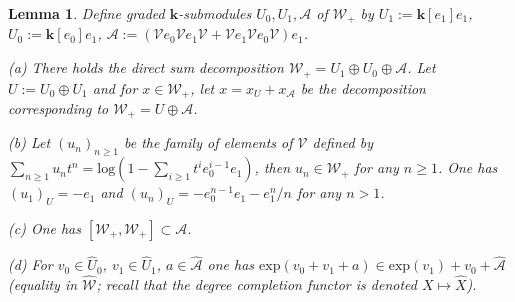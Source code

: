 \documentclass[10pt]{amsart}
\newtheorem{lem}[thm]{Lemma}
\numberwithin{equation}{subsection}
\begin{document}
\begin{lem}\label{lemma:basics:BIS}
Define graded $\mathbf k$-submodules  $U_0,U_1,\mathcal A$ of $\mathcal W_+$ by 
$U_1:=\mathbf k[e_1]e_1$, $U_0:=\mathbf k[e_0]e_1$, 
$\mathcal A:=(\mathcal Ve_0\mathcal Ve_1\mathcal V+\mathcal Ve_1\mathcal Ve_0\mathcal V)e_1$.

(a) There holds the direct sum decomposition $\mathcal W_+=U_1\oplus U_0\oplus\mathcal A$. Let $U:=U_0\oplus U_1$ 
and for $x\in \mathcal W_+$, let $x=x_U+x_{\mathcal A}$ be the 
decomposition corresponding to $\mathcal W_+=U\oplus\mathcal A$. 

(b) Let $(u_n)_{n\geq 1}$ be the family of elements of $\mathcal V$ defined by $\sum_{n\geq 1}u_nt^n=
\mathrm{log}(1-\sum_{i\geq 1}t^ie_0^{i-1}e_1)$, then $u_n\in\mathcal W_+$ for any $n\geq1$. One has $(u_1)_U=-e_1$ and 
$(u_n)_U=-e_0^{n-1}e_1-e_1^n/n$ for any $n>1$. 

(c) One has $[\mathcal W_+,\mathcal W_+]\subset\mathcal A$. 

(d) For $v_0\in \hat U_0$, $v_1\in \hat U_1$, $a\in\hat{\mathcal A}$ one has $\mathrm{exp}(v_0+v_1+a)\in 
\mathrm{exp}(v_1)+v_0+\hat{\mathcal A}$ (equality in $\hat{\mathcal W}$; recall that the degree completion functor is 
denoted $X\mapsto\hat X$). 
\end{lem}
\end{document}
